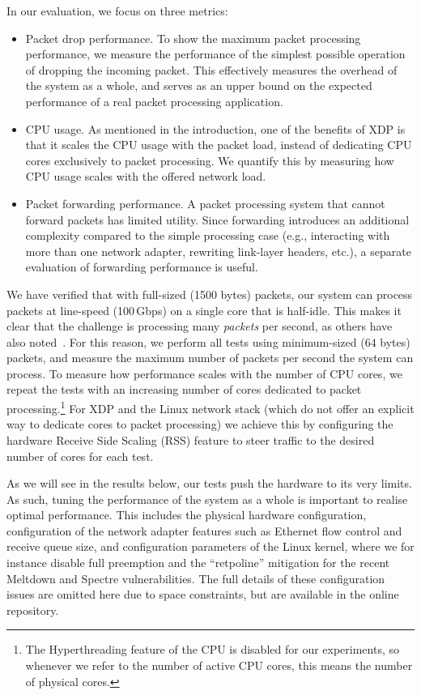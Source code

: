 \documentclass[sigconf]{acmart}
\begin{document}
In our evaluation, we focus on three metrics:

\begin{itemize}
\item Packet drop performance. To show the maximum packet processing
  performance, we measure the performance of the simplest possible operation of
  dropping the incoming packet. This effectively measures the overhead of the
  system as a whole, and serves as an upper bound on the expected performance of
  a real packet processing application.

\item CPU usage. As mentioned in the introduction, one of the benefits of XDP is
  that it scales the CPU usage with the packet load, instead of dedicating CPU
  cores exclusively to packet processing. We quantify this by measuring how CPU
  usage scales with the offered network load.

\item Packet forwarding performance. A packet processing system that cannot
  forward packets has limited utility. Since forwarding introduces an additional
  complexity compared to the simple processing case (e.g., interacting with more
  than one network adapter, rewriting link-layer headers, etc.), a separate
  evaluation of forwarding performance is useful.
\end{itemize}

We have verified that with full-sized (1500 bytes) packets, our system can
process packets at line-speed (100\,Gbps) on a single core that is half-idle.
This makes it clear that the challenge is processing many \emph{packets} per
second, as others have also noted~\cite{rizzo2012netmap}. For this reason, we
perform all tests using minimum-sized (64 bytes) packets, and measure the
maximum number of packets per second the system can process. To measure how
performance scales with the number of CPU cores, we repeat the tests with an
increasing number of cores dedicated to packet processing.\footnote{The
  Hyperthreading feature of the CPU is disabled for our experiments, so whenever
  we refer to the number of active CPU cores, this means the number of physical
  cores.} For XDP and the Linux network stack (which do not offer an explicit
way to dedicate cores to packet processing) we achieve this by configuring the
hardware Receive Side Scaling (RSS) feature to steer traffic to the desired
number of cores for each test.

As we will see in the results below, our tests push the hardware to its very
limits. As such, tuning the performance of the system as a whole is important to
realise optimal performance. This includes the physical hardware configuration,
configuration of the network adapter features such as Ethernet flow control and
receive queue size, and configuration parameters of the Linux kernel, where we
for instance disable full preemption and the ``retpoline'' mitigation for the
recent Meltdown and Spectre vulnerabilities. The full details of these
configuration issues are omitted here due to space constraints, but are
available in the online repository.
\end{document}
